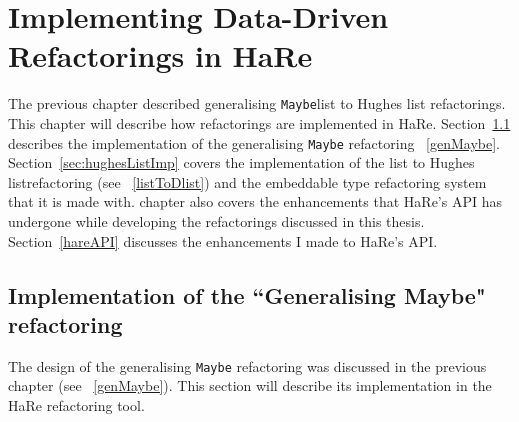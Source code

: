 \chapter{Implementing Data-Driven Refactorings in HaRe}
\DIFdelbegin %
\DIFdelend \DIFaddbegin \label{chp:generalImp}
\DIFaddend 

\renewcommand{\topfraction}{1}
\renewcommand{\floatpagefraction}{1}

The previous chapter described \DIFdelbegin {}\DIFdelend \DIFaddbegin {}\DIFaddend generalising \texttt{Maybe}\DIFdelbegin {}\DIFdelend \DIFaddbegin {}\DIFaddend list to Hughes list refactorings\DIFaddbegin {}\DIFaddend . This chapter will describe how refactorings are implemented in HaRe. \DIFaddbegin {}\DIFaddend Section~\ref{sec:genMaybeImp} \DIFaddbegin {}\DIFaddend describes the implementation of the generalising \texttt{Maybe} refactoring \DIFdelbegin {}\DIFdelend \DIFaddbegin {}\DIFaddend ~\ref{genMaybe}. Section~\ref{sec:hughesListImp} covers the implementation of the \DIFaddbegin {}\DIFaddend list to Hughes list\DIFaddbegin {}\DIFaddend refactoring (see \DIFdelbegin {}\DIFdelend \DIFaddbegin {}\DIFaddend ~\ref{listToDlist}) and the embeddable type refactoring system that it is made with. \DIFdelbegin {}\DIFdelend \DIFaddbegin {}\DIFaddend chapter also covers the enhancements that HaRe's API has undergone while developing the refactorings discussed in this thesis. Section~\ref{hareAPI} discusses the enhancements I made to HaRe's API.

\section{Implementation of the ``Generalising Maybe" refactoring}
\label{sec:genMaybeImp}

The design of the generalising \texttt{Maybe} refactoring was discussed in the previous chapter (see \DIFdelbegin {}\DIFdelend \DIFaddbegin {}\DIFaddend ~\ref{genMaybe}). This section will describe its implementation in the HaRe refactoring tool. 

